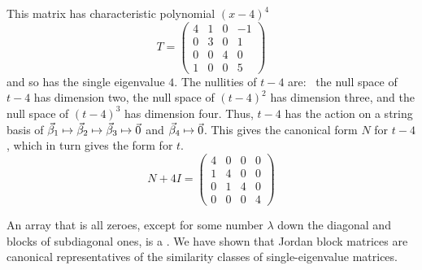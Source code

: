 \begin{example}
This matrix has characteristic polynomial \( (x-4)^4 \) 
\begin{equation*}
  T=
  \begin{pmatrix}
    4  &1  &0  &-1  \\
    0  &3  &0  &1   \\
    0  &0  &4  &0   \\
    1  &0  &0  &5
   \end{pmatrix}
\end{equation*}
and so has the single eigenvalue $4$.
The nullities of $t-4$ are:~
the null space of $t-4$ has dimension two, the null space of $(t-4)^2$
has dimension three, and the null space of $(t-4)^3$ has dimension four.
Thus, $t-4$ has the action on a string basis of
$\vec{\beta}_1\mapsto\vec{\beta}_2\mapsto\vec{\beta}_3\mapsto\vec{0}$ and
$\vec{\beta}_4\mapsto\vec{0}$.
This gives the canonical form $N$ for $t-4$, which in turn gives the
form for \( t \).
\begin{equation*}
  N+4I=
  \begin{pmatrix}
    4  &0  &0  &0   \\
    1  &4  &0  &0   \\
    0  &1  &4  &0   \\
    0  &0  &0  &4
   \end{pmatrix}
\end{equation*}
\end{example}

An array that is all zeroes, except for some number $\lambda$
down the diagonal and blocks of subdiagonal ones, is a 
.
We have shown that Jordan block matrices are
canonical representatives of the similarity classes of single-eigenvalue
matrices.

